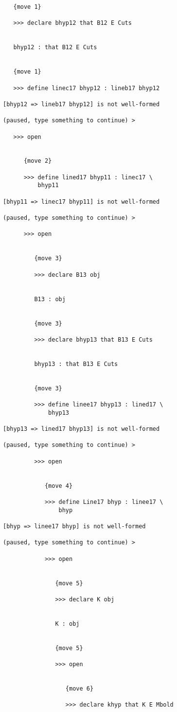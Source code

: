 \documentclass[12pt]{article}
\begin{document}
\begin{verbatim}
   {move 1}

   >>> declare bhyp12 that B12 E Cuts


   bhyp12 : that B12 E Cuts


   {move 1}

   >>> define linec17 bhyp12 : lineb17 bhyp12

[bhyp12 => lineb17 bhyp12] is not well-formed

(paused, type something to continue) >

   >>> open


      {move 2}

      >>> define lined17 bhyp11 : linec17 \
          bhyp11

[bhyp11 => linec17 bhyp11] is not well-formed

(paused, type something to continue) >

      >>> open


         {move 3}

         >>> declare B13 obj


         B13 : obj


         {move 3}

         >>> declare bhyp13 that B13 E Cuts


         bhyp13 : that B13 E Cuts


         {move 3}

         >>> define linee17 bhyp13 : lined17 \
             bhyp13

[bhyp13 => lined17 bhyp13] is not well-formed

(paused, type something to continue) >

         >>> open


            {move 4}

            >>> define Line17 bhyp : linee17 \
                bhyp

[bhyp => linee17 bhyp] is not well-formed

(paused, type something to continue) >

            >>> open


               {move 5}

               >>> declare K obj


               K : obj


               {move 5}

               >>> open


                  {move 6}

                  >>> declare khyp that K E Mbold



\end{verbatim}
\end{document}
